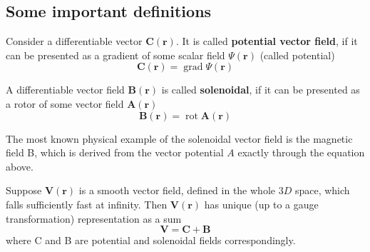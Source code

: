 \subsection{Some important definitions}
\begin{defi}
        Consider a differentiable vector $\mathbf{C}(\mathbf{r}) .$ It is called \textbf{potential vector field}, if it can be presented as a gradient of some scalar field $\Psi(\mathbf{r})$ (called potential)
        \begin{equation}
\mathbf{C}(\mathbf{r})=\operatorname{grad} \Psi(\mathbf{r})
\end{equation}
\end{defi}
\begin{defi}
        A differentiable vector field $\mathbf{B}(\mathbf{r})$ is called \textbf{solenoidal}, if it can be presented as a rotor of some vector field $\mathbf{A}(\mathbf{r})$
        \begin{equation}
\mathbf{B}(\mathbf{r})=\operatorname{rot} \mathbf{A}(\mathbf{r})
\end{equation}
\end{defi}
The most known physical example of the solenoidal vector field is the magnetic field B, which is derived from the vector potential $A$ exactly through the equation above.
\begin{thm}
Suppose $\mathbf{V}(\mathbf{r})$ is a smooth vector field, defined in the whole $3 D$ space, which falls sufficiently fast at infinity. Then $\mathbf{V}(\mathbf{r})$ has unique (up to a gauge transformation) representation as a sum
$$
\mathbf{V}=\mathbf{C}+\mathbf{B}
$$
where C and B are potential and solenoidal fields correspondingly.
\end{thm}

